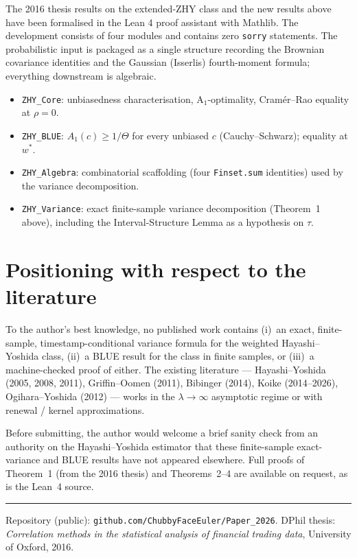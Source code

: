 \documentclass[11pt]{article}
\begin{document}
The 2016 thesis results on the extended-ZHY class and the new
results above have been formalised in the Lean 4 proof assistant
with Mathlib. The development consists of four modules and
contains zero \texttt{sorry} statements. The probabilistic input
is packaged as a single structure recording the Brownian
covariance identities and the Gaussian (Isserlis) fourth-moment
formula; everything downstream is algebraic.
\begin{itemize}\itemsep2pt
\item \texttt{ZHY\_Core}: unbiasedness characterisation, A$_1$-optimality,
Cram\'er--Rao equality at $\rho = 0$.
\item \texttt{ZHY\_BLUE}: $A_1(c) \ge 1 / \Theta$ for every unbiased $c$
(Cauchy--Schwarz); equality at $w^*$.
\item \texttt{ZHY\_Algebra}: combinatorial scaffolding (four
\texttt{Finset.sum} identities) used by the variance decomposition.
\item \texttt{ZHY\_Variance}: exact finite-sample variance
decomposition (Theorem~1 above), including the
Interval-Structure Lemma as a hypothesis on $\tau$.
\end{itemize}

\section*{Positioning with respect to the literature}

To the author's best knowledge, no published work contains (i)~an
exact, finite-sample, timestamp-conditional variance formula for
the weighted Hayashi--Yoshida class, (ii)~a BLUE result for the
class in finite samples, or (iii)~a machine-checked proof of
either. The existing literature ---
Hayashi--Yoshida (2005, 2008, 2011),
Griffin--Oomen (2011),
Bibinger (2014),
Koike (2014--2026),
Ogihara--Yoshida (2012) --- works in the $\lambda \to \infty$
asymptotic regime or with renewal / kernel approximations.

Before submitting, the author would welcome a brief sanity check
from an authority on the Hayashi--Yoshida estimator that these
finite-sample exact-variance and BLUE results have not appeared
elsewhere. Full proofs of Theorem~1 (from the 2016 thesis) and
Theorems~2--4 are available on request, as is the Lean~4 source.

\vspace{0.5em}\hrule\vspace{0.3em}
\footnotesize
Repository (public): \texttt{github.com/ChubbyFaceEuler/Paper\_2026}.
DPhil thesis: \emph{Correlation methods in the statistical analysis of
financial trading data}, University of Oxford, 2016.
\end{document}
